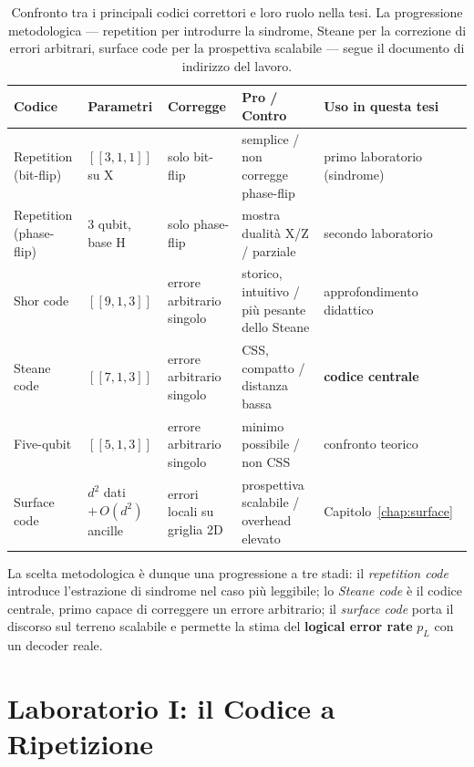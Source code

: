 \begin{onehalfspace}
\begin{table}[H]
\centering
\scriptsize
\begin{tabularx}{\textwidth}{@{}p{2.0cm}p{1.6cm}XXX@{}}
\toprule
\textbf{Codice} & \textbf{Parametri} & \textbf{Corregge} & \textbf{Pro / Contro} & \textbf{Uso in questa tesi} \\
\midrule
Repetition (bit-flip) & $[[3,1,1]]$ su X & solo bit-flip & semplice / non corregge phase-flip & primo laboratorio (sindrome) \\
Repetition (phase-flip) & 3 qubit, base H & solo phase-flip & mostra dualità X/Z / parziale & secondo laboratorio \\
Shor code & $[[9,1,3]]$ & errore arbitrario singolo & storico, intuitivo / più pesante dello Steane & approfondimento didattico~\cite{shorcorrection1995} \\
Steane code & $[[7,1,3]]$ & errore arbitrario singolo & \ac{CSS}, compatto / distanza bassa & \textbf{codice centrale}~\cite{steane1996} \\
Five-qubit & $[[5,1,3]]$ & errore arbitrario singolo & minimo possibile / non \ac{CSS} & confronto teorico \\
Surface code & $d^2$ dati $+\,O(d^2)$ ancille & errori locali su griglia 2D & prospettiva scalabile / overhead elevato & Capitolo~\ref{chap:surface}~\cite{fowler2012} \\
\bottomrule
\end{tabularx}
\caption[Confronto tra codici correttori quantistici]{Confronto tra i principali codici correttori e loro ruolo nella tesi. La progressione metodologica --- repetition per introdurre la sindrome, Steane per la correzione di errori arbitrari, surface code per la prospettiva scalabile --- segue il documento di indirizzo del lavoro.}
\label{tab:confronto_codici}
\end{table}

La scelta metodologica è dunque una progressione a tre stadi: il \emph{repetition code} introduce l'estrazione di sindrome nel caso più leggibile; lo \emph{Steane code} è il codice centrale, primo capace di correggere un errore arbitrario; il \emph{surface code} porta il discorso sul terreno scalabile e permette la stima del \textbf{logical error rate} $p_L$ con un decoder reale.

\section{Laboratorio I: il Codice a Ripetizione}
\label{sec:repetition}


\end{onehalfspace}
